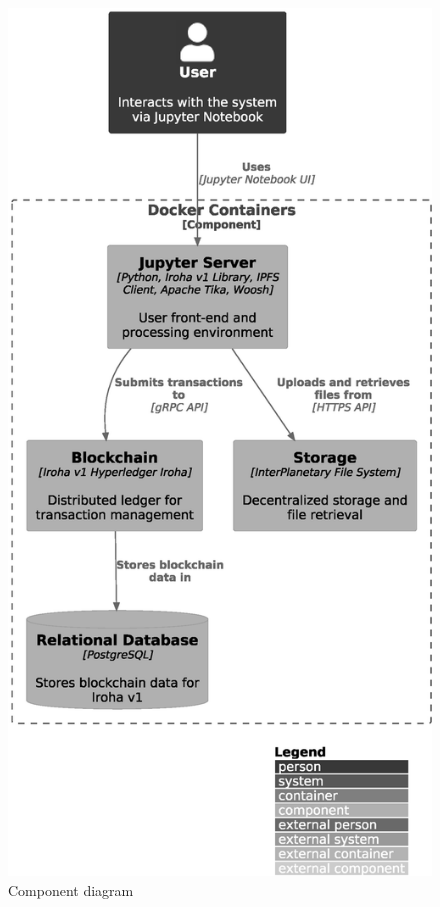 \documentclass[final]{rc-book-2.14}
\begin{document}
\begin{figure}[htbp]
    \centering
    \includegraphics[scale=0.4]{fig/c4_component_diagram.eps}
    \caption{Component diagram}
    \label{fig:c4_component_diagram}
\end{figure}
\end{document}
